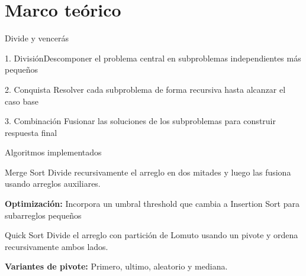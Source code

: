 
\section{Marco teórico} 
\begin{frame}[fragile]{Divide y vencerás}
    \begin{block}{1. División}Descomponer el problema central en subproblemas independientes más pequeños\end{block}
    \begin{block}{2. Conquista} Resolver cada subproblema de forma recursiva hasta alcanzar  el caso base\end{block}
    \begin{block}{3. Combinación} Fusionar las soluciones de los subproblemas para construir respuesta final\end{block}

\end{frame}



\begin{frame}{Algoritmos implementados}
    \begin{block}{Merge Sort}
        Divide recursivamente el arreglo en dos mitades y luego las fusiona usando arreglos auxiliares. \newline
        
        \textbf{Optimización:} Incorpora un umbral threshold que cambia a Insertion Sort para subarreglos pequeños

    \end{block}

    \begin{block}{Quick Sort}
        Divide el arreglo con partición de Lomuto usando un pivote y ordena recursivamente ambos lados. \newline

        \textbf{Variantes de pivote:} Primero, ultimo, aleatorio y mediana.
    \end{block}

\end{frame}

